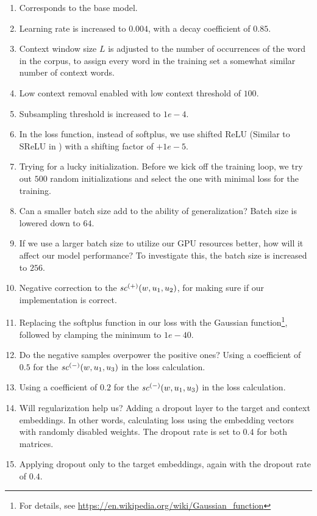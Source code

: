 \begin{enumerate}
    \item Corresponds to the base model.
    \item Learning rate is increased to $0.004$, with a decay coefficient of $0.85$.
    \item Context window size $L$ is adjusted to the number of occurrences of the word in the corpus, to assign every word in the training set a somewhat similar number of context words.
    \item Low context removal enabled with low context threshold of $100$.
    \item Subsampling threshold is increased to $1e-4$.
    \item In the loss function, instead of softplus, we use shifted \ac{ReLU} (Similar to SReLU in \cite{srelu}) with a shifting factor of $+1e-5$.
    \item Trying for a lucky initialization. Before we kick off the training loop, we try out $500$ random initializations and select the one with minimal loss for the training.
    \item Can a smaller batch size add to the ability of generalization? Batch size is lowered down to $64$.
    \item If we use a larger batch size to utilize our GPU resources better, how will it affect our model performance? To investigate this, the batch size is increased to $256$.
    \item Negative correction to the $\mathit{sc}^{({+})}({w, u_1, u_2})$, for making sure if our implementation is correct.
    \item Replacing the softplus function in our loss with the Gaussian function\footnote{For details, see \url{https://en.wikipedia.org/wiki/Gaussian_function}}, followed by clamping the minimum to $1e-40$.
    \item Do the negative samples overpower the positive ones? Using a coefficient of $0.5$ for the $\mathit{sc}^{({-})}({w, u_1, u_3})$ in the loss calculation.
    \item Using a coefficient of $0.2$ for the $\mathit{sc}^{({-})}({w, u_1, u_3})$ in the loss calculation.
    \item Will regularization help us? Adding a dropout layer to the target and context embeddings. In other words, calculating loss using the embedding vectors with randomly disabled weights. The dropout rate is set to $0.4$ for both matrices.
    \item Applying dropout only to the target embeddings, again with the dropout rate of $0.4$.

\end{enumerate}
